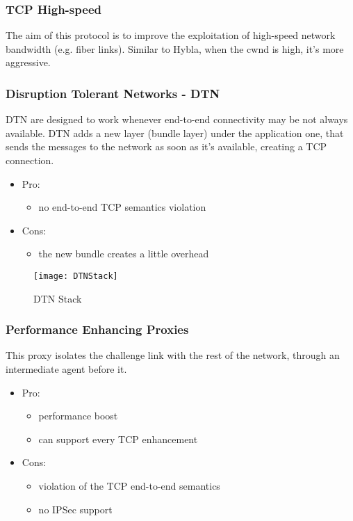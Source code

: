 \subsubsection{TCP High-speed}
The aim of this protocol is to improve the exploitation of high-speed network
bandwidth (e.g. fiber links). Similar to Hybla, when the cwnd is high, it's
more aggressive.

\subsubsection{Disruption Tolerant Networks - DTN}
DTN are designed to work whenever end-to-end connectivity may be not always
available. DTN adds a new layer (bundle layer) under the application one, that
sends the messages to the network as soon as it's available, creating a TCP
connection.
\begin{itemize}
\item Pro:
  \begin{itemize}
    \item no end-to-end TCP semantics violation
  \end{itemize}
\item Cons:
  \begin{itemize}
    \item the new bundle creates a little overhead
  \end{itemize}
\end{itemize}

\begin{figure}[H]
  \centering
  \texttt{[image: DTNStack]}
  \caption{DTN Stack}
\end{figure}

\subsubsection{Performance Enhancing Proxies}
This proxy isolates the challenge link with the rest of the network, through an
intermediate agent before it.
\begin{itemize}
  \item Pro:
    \begin{itemize}
    \item performance boost
    \item can support every TCP enhancement
    \end{itemize}
  \item Cons:
    \begin{itemize}
    \item violation of the TCP end-to-end semantics
    \item no IPSec support
    \end{itemize}
\end{itemize}

